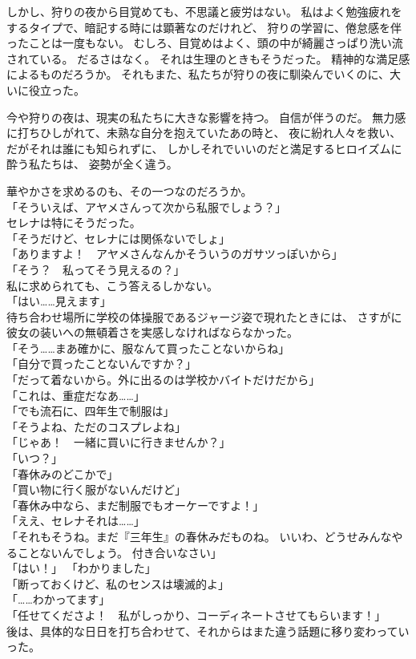 \documentclass[../IHMain]{subfiles}
\begin{document}
しかし、狩りの夜から目覚めても、不思議と疲労はない。
私はよく勉強疲れをするタイプで、暗記する時には顕著なのだけれど、
狩りの学習に、倦怠感を伴ったことは一度もない。
むしろ、目覚めはよく、頭の中が綺麗さっぱり洗い流されている。
だるさはなく。
それは生理のときもそうだった。
精神的な満足感によるものだろうか。
それもまた、私たちが狩りの夜に馴染んでいくのに、大いに役立った。

今や狩りの夜は、現実の私たちに大きな影響を持つ。
自信が伴うのだ。
無力感に打ちひしがれて、未熟な自分を抱えていたあの時と、
夜に紛れ人々を救い、だがそれは誰にも知られずに、
しかしそれでいいのだと満足するヒロイズムに酔う私たちは、
姿勢が全く違う。

華やかさを求めるのも、その一つなのだろうか。\\
「そういえば、アヤメさんって次から私服でしょう？」\\
セレナは特にそうだった。\\
「そうだけど、セレナには関係ないでしょ」\\
「ありますよ！　アヤメさんなんかそういうのガサツっぽいから」\\
「そう？　私ってそう見えるの？」\\
私に求められても、こう答えるしかない。\\
「はい……見えます」\\
待ち合わせ場所に学校の体操服であるジャージ姿で現れたときには、
さすがに彼女の装いへの無頓着さを実感しなければならなかった。\\
「そう……まあ確かに、服なんて買ったことないからね」\\
「自分で買ったことないんですか？」\\
「だって着ないから。外に出るのは学校かバイトだけだから」\\
「これは、重症だなあ……」\\
「でも流石に、四年生で制服は」\\
「そうよね、ただのコスプレよね」\\
「じゃあ！　一緒に買いに行きませんか？」\\
「いつ？」\\
「春休みのどこかで」\\
「買い物に行く服がないんだけど」\\
「春休み中なら、まだ制服でもオーケーですよ！」\\
「ええ、セレナそれは……」\\
「それもそうね。まだ『三年生』の春休みだものね。
いいわ、どうせみんなやることないんでしょう。
付き合いなさい」\\
「はい！」
「わかりました」\\
「断っておくけど、私のセンスは壊滅的よ」\\
「……わかってます」\\
「任せてくださよ！　私がしっかり、コーディネートさせてもらいます！」\\
後は、具体的な日日を打ち合わせて、それからはまた違う話題に移り変わっていった。
\end{document}
